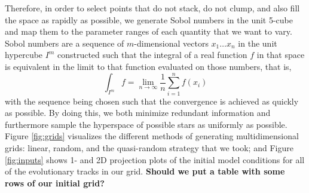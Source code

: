 \documentclass[manuscript]{aastex}
\begin{document}
Therefore, in order to select points that do not stack, do not clump, and also fill the space as rapidly as possible, we generate Sobol numbers \citep{sobol1967distribution} in the unit 5-cube and map them to the parameter ranges of each quantity that we want to vary. Sobol numbers are a sequence of $m$-dimensional vectors $x_1 \ldots x_n$ in the unit hypercube $I^m$ constructed such that the integral of a real function $f$ in that space is equivalent in the limit to that function evaluated on those numbers, that is,
\begin{equation}
    \int_{I^m} f = \lim_{n \to \infty} \frac{1}{n}\sum_{i=1}^n f(x_i)
\end{equation}
with the sequence being chosen such that the convergence is achieved as quickly as possible. By doing this, we both minimize redundant information and furthermore sample the hyperspace of possible stars as uniformly as possible. Figure \ref{fig:grids} visualizes the different methods of generating multidimensional grids: linear, random, and the quasi-random strategy that we took; and Figure \ref{fig:inputs} shows 1- and 2D projection plots of the initial model conditions for all of the evolutionary tracks in our grid. \textbf{Should we put a table with some rows of our initial grid?}

\begin{figure*}
    \centering
    \caption{Results of different methods for generating multidimensional grids portrayed via a unit cube projected onto a unit square. Linear (left), random (middle), and quasi-random (right) grids are generated in three dimensions, with color depicting the third dimension, i.e., the distance between the reader and the screen. %
    From top to bottom, all three methods are shown with 100, 400, and 2000 points generated, respectively. }%
    \label{fig:grids}
\end{figure*}
\end{document}
